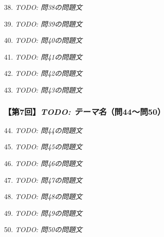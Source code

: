 \documentclass[b4paper,7pt,twocolumn,landscape]{jsarticle}
\begin{document}
\begin{enumerate}
\setcounter{enumi}{37}
\item \textit{TODO: 問38の問題文}\\

\item \textit{TODO: 問39の問題文}\\

\item \textit{TODO: 問40の問題文}\\

\item \textit{TODO: 問41の問題文}\\

\item \textit{TODO: 問42の問題文}\\

\item \textit{TODO: 問43の問題文}\\
\end{enumerate}

\subsubsection*{【第7回】\textit{TODO: テーマ名}（問44〜問50）}

\begin{enumerate}
\setcounter{enumi}{43}
\item \textit{TODO: 問44の問題文}\\

\item \textit{TODO: 問45の問題文}\\

\item \textit{TODO: 問46の問題文}\\

\item \textit{TODO: 問47の問題文}\\

\item \textit{TODO: 問48の問題文}\\

\item \textit{TODO: 問49の問題文}\\

\item \textit{TODO: 問50の問題文}\\
\end{enumerate}
\end{document}
